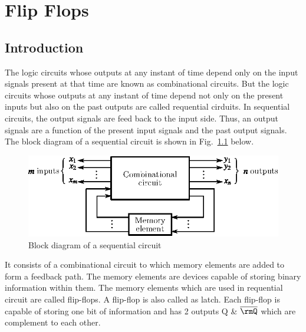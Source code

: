 \makeatletter
\def\@makechapterhead#1{%
  \vspace*{10\p@}%
  {\parindent \z@ \raggedleft \normalfont
    \ifnum \c@secnumdepth >\m@ne
      \if@mainmatter
        \LARGE\bfseries \@chapapp\space \thechapter
	\vskip 4pt
        \hrule height 2pt
        \par\nobreak
        \vskip 5\p@
      \fi
    \fi
    \interlinepenalty\@M
    \huge \bfseries #1\par\nobreak
\vskip 5pt

\hrule height 2pt   
 \vskip 10\p@  
  }}
\makeatother

\chapter{Flip Flops}\label{chap6}

\section{Introduction}\label{sec6.1}
The logic circuits whose outputs at any instant of time depend only on
the input signals present at that time are known as combinational
circuits. But the logic circuits whose outputs at any instant of time
depend not only on the present inputs but also on the past outputs are
called requential cirduits. In sequential circuits, the output signals
are feed back to the input side. Thus, an output signals are a function
of the present input signals and the past output signals. The block
diagram of a sequential circuit is shown in Fig.~\ref{fig6.1}  below.
\begin{figure}[H]
\centering
\includegraphics[scale=1.1]{chap6/fig6.1.eps}
\caption{Block diagram of a sequential circuit}\label{fig6.1}
\end{figure}

It consists of a combinational circuit to which memory elements are
added to form a feedback path. The memory elements are devices capable
of storing binary information within them. The memory elements which
are used in requential circuit are called flip-flops. A flip-flop is
also called as latch. Each flip-flop is capable of storing one bit of
information and has 2 outputs Q \& $\overline{\rmQ}$ which are complement
to each other.

